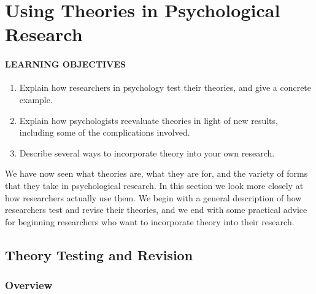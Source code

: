 \documentclass[
]{krantz}
\providecommand{\tightlist}{%
  \setlength{\itemsep}{0pt}\setlength{\parskip}{0pt}}
\begin{document}
\section{Using Theories in Psychological Research}\label{using-theories-in-psychological-research}

\paragraph*{LEARNING OBJECTIVES}\label{learning-objectives-29}

\begin{enumerate}
\def\labelenumi{\arabic{enumi}.}
\tightlist
\item
  Explain how researchers in psychology test their theories, and give a concrete example.
\item
  Explain how psychologists reevaluate theories in light of new results, including some of the complications involved.
\item
  Describe several ways to incorporate theory into your own research.
\end{enumerate}

We have now seen what theories are, what they are for, and the variety of forms that they take in psychological research. In this section we look more closely at how researchers actually use them. We begin with a general description of how researchers test and revise their theories, and we end with some practical advice for beginning researchers who want to incorporate theory into their research.

\subsection*{Theory Testing and Revision}\label{theory-testing-and-revision}


\subsubsection*{Overview}\label{overview-1}
\end{document}
